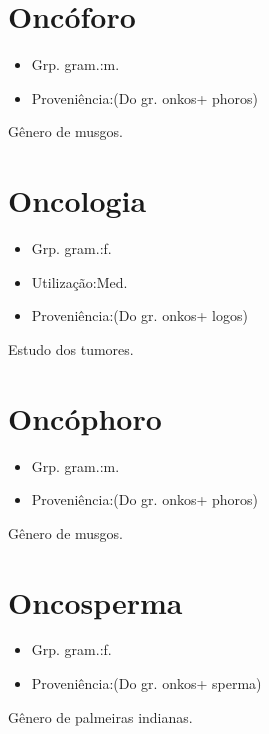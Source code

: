 \section{Oncóforo}
\begin{itemize}
\item {Grp. gram.:m.}
\end{itemize}
\begin{itemize}
\item {Proveniência:(Do gr. \textunderscore onkos\textunderscore  + \textunderscore phoros\textunderscore )}
\end{itemize}
Gênero de musgos.
\section{Oncologia}
\begin{itemize}
\item {Grp. gram.:f.}
\end{itemize}
\begin{itemize}
\item {Utilização:Med.}
\end{itemize}
\begin{itemize}
\item {Proveniência:(Do gr. \textunderscore onkos\textunderscore  + \textunderscore logos\textunderscore )}
\end{itemize}
Estudo dos tumores.
\section{Oncóphoro}
\begin{itemize}
\item {Grp. gram.:m.}
\end{itemize}
\begin{itemize}
\item {Proveniência:(Do gr. \textunderscore onkos\textunderscore  + \textunderscore phoros\textunderscore )}
\end{itemize}
Gênero de musgos.
\section{Oncosperma}
\begin{itemize}
\item {Grp. gram.:f.}
\end{itemize}
\begin{itemize}
\item {Proveniência:(Do gr. \textunderscore onkos\textunderscore  + \textunderscore sperma\textunderscore )}
\end{itemize}
Gênero de palmeiras indianas.

